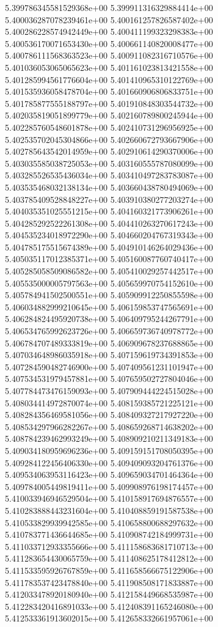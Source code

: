 5.399786345581529368e+00
5.399911316329884414e+00
5.400036287078239461e+00
5.400161257826587402e+00
5.400286228574942449e+00
5.400411199323298383e+00
5.400536170071653430e+00
5.400661140820008477e+00
5.400786111568363523e+00
5.400911082316710576e+00
5.401036053065065623e+00
5.401161023813421558e+00
5.401285994561776604e+00
5.401410965310122769e+00
5.401535936058478704e+00
5.401660906806833751e+00
5.401785877555188797e+00
5.401910848303544732e+00
5.402035819051899779e+00
5.402160789800245944e+00
5.402285760548601878e+00
5.402410731296956925e+00
5.402535702045304866e+00
5.402660672793667906e+00
5.402785643542014959e+00
5.402910614290370006e+00
5.403035585038725053e+00
5.403160555787080099e+00
5.403285526535436034e+00
5.403410497283783087e+00
5.403535468032138134e+00
5.403660438780494069e+00
5.403785409528848227e+00
5.403910380277203274e+00
5.404035351025551215e+00
5.404160321773906261e+00
5.404285292522261308e+00
5.404410263270617243e+00
5.404535234018972290e+00
5.404660204767319343e+00
5.404785175515674389e+00
5.404910146264029436e+00
5.405035117012385371e+00
5.405160087760740417e+00
5.405285058509086582e+00
5.405410029257442517e+00
5.405535000005797563e+00
5.405659970754152610e+00
5.405784941502500551e+00
5.405909912250855598e+00
5.406034882999210645e+00
5.406159853747565691e+00
5.406284824495920738e+00
5.406409795244267791e+00
5.406534765992623726e+00
5.406659736740978772e+00
5.406784707489333819e+00
5.406909678237688865e+00
5.407034648986035918e+00
5.407159619734391853e+00
5.407284590482746900e+00
5.407409561231101947e+00
5.407534531979457881e+00
5.407659502727804046e+00
5.407784473476159093e+00
5.407909444224515028e+00
5.408034414972870074e+00
5.408159385721225121e+00
5.408284356469581056e+00
5.408409327217927220e+00
5.408534297966282267e+00
5.408659268714638202e+00
5.408784239462993249e+00
5.408909210211349183e+00
5.409034180959696236e+00
5.409159151708050395e+00
5.409284122456406330e+00
5.409409093204761376e+00
5.409534063953116423e+00
5.409659034701464364e+00
5.409784005449819411e+00
5.409908976198174457e+00
5.410033946946529504e+00
5.410158917694876557e+00
5.410283888443231604e+00
5.410408859191587538e+00
5.410533829939942585e+00
5.410658800688297632e+00
5.410783771436644685e+00
5.410908742184999731e+00
5.411033712933355666e+00
5.411158683681710713e+00
5.411283654430065759e+00
5.411408625178412812e+00
5.411533595926767859e+00
5.411658566675122906e+00
5.411783537423478840e+00
5.411908508171833887e+00
5.412033478920180940e+00
5.412158449668535987e+00
5.412283420416891033e+00
5.412408391165246080e+00
5.412533361913602015e+00
5.412658332661957061e+00
